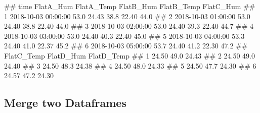 \documentclass[
]{book}
\let\oldverbatim\verbatim
\let\endoldverbatim\endverbatim
\renewenvironment{verbatim}{\footnotesize\oldverbatim}{\endoldverbatim}
\begin{document}
\begin{verbatim}
##                  time FlatA_Hum FlatA_Temp FlatB_Hum FlatB_Temp FlatC_Hum
## 1 2018-10-03 00:00:00      53.0      24.43      38.8      22.40      44.0
## 2 2018-10-03 01:00:00      53.0      24.40      38.8      22.40      44.0
## 3 2018-10-03 02:00:00      53.0      24.40      39.3      22.40      44.7
## 4 2018-10-03 03:00:00      53.0      24.40      40.3      22.40      45.0
## 5 2018-10-03 04:00:00      53.3      24.40      41.0      22.37      45.2
## 6 2018-10-03 05:00:00      53.7      24.40      41.2      22.30      47.2
##   FlatC_Temp FlatD_Hum FlatD_Temp
## 1      24.50      49.0      24.43
## 2      24.50      49.0      24.40
## 3      24.50      48.3      24.38
## 4      24.50      48.0      24.33
## 5      24.50      47.7      24.30
## 6      24.57      47.2      24.30
\end{verbatim}

\hypertarget{DATAWRANGLING-MERGE-TWO-DATAFRAMES}{%
\subsection{Merge two Dataframes}\label{DATAWRANGLING-MERGE-TWO-DATAFRAMES}}
\end{document}
